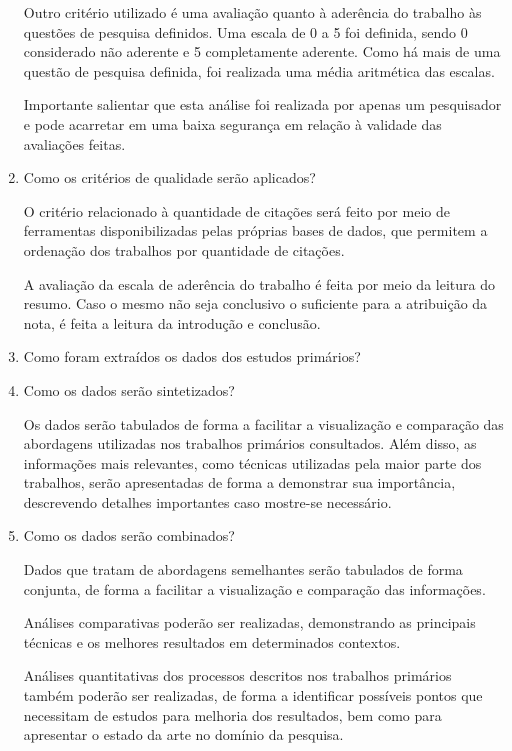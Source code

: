 \documentclass[a4paper,11pt]{article}
\begin{document}
\begin{enumerate}
Outro critério utilizado é uma avaliação quanto à aderência do trabalho às questões de pesquisa definidos. Uma escala de 0 a 5 foi definida, sendo 0 considerado não aderente e 5 completamente aderente. Como há mais de uma questão de pesquisa definida, foi realizada uma média aritmética das escalas.

Importante salientar que esta análise foi realizada por apenas um pesquisador e pode acarretar em uma baixa segurança em relação à validade das avaliações feitas.

\item{Como os critérios de qualidade serão aplicados?}

O critério relacionado à quantidade de citações será feito por meio de ferramentas disponibilizadas pelas próprias bases de dados, que permitem a ordenação dos trabalhos por quantidade de citações.

A avaliação da escala de aderência do trabalho é feita por meio da leitura do resumo. Caso o mesmo não seja conclusivo o suficiente para a atribuição da nota, é feita a leitura da introdução e conclusão.

\item{Como foram extraídos os dados dos estudos primários?}

\item{Como os dados serão sintetizados?}

Os dados serão tabulados de forma a facilitar a visualização e comparação das abordagens utilizadas nos trabalhos primários consultados. Além disso, as informações mais relevantes, como técnicas utilizadas pela maior parte dos trabalhos, serão apresentadas de forma a demonstrar sua importância, descrevendo detalhes importantes caso mostre-se necessário.


\item{Como os dados serão combinados?}

Dados que tratam de abordagens semelhantes serão tabulados de forma conjunta, de forma a facilitar a visualização e comparação das informações.

Análises comparativas poderão ser realizadas, demonstrando as principais técnicas e os melhores resultados em determinados contextos.

Análises quantitativas dos processos descritos nos trabalhos primários também poderão ser realizadas, de forma a identificar possíveis pontos que necessitam de estudos para melhoria dos resultados, bem como para apresentar o estado da arte no domínio da pesquisa.

\end{enumerate}


\end{document}

